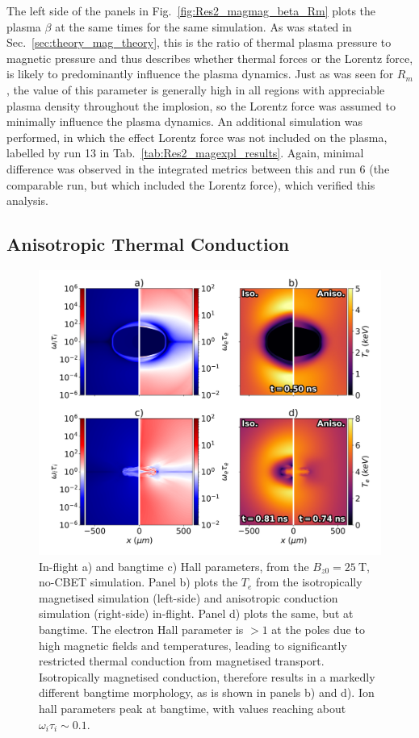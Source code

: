 The left side of the panels in Fig.~\ref{fig:Res2_magmag_beta_Rm} plots the plasma $\beta$ at the same times for the same simulation.
As was stated in Sec.~\ref{sec:theory_mag_theory}, this is the ratio of thermal plasma pressure to magnetic pressure and thus describes whether thermal forces or the Lorentz force, is likely to predominantly influence the plasma dynamics.
Just as was seen for $R_m$, the value of this parameter is generally high in all regions with appreciable plasma density throughout the implosion, so the Lorentz force was assumed to minimally influence the plasma dynamics.
An additional simulation was performed, in which the effect Lorentz force was not included on the plasma, labelled by run 13 in Tab.~\ref{tab:Res2_magexpl_results}.
Again, minimal difference was observed in the integrated metrics between this and run 6 (the comparable run, but which included the Lorentz force), which verified this analysis.

\subsection{Anisotropic Thermal Conduction}%
\label{sec:Res2_aniso}

\begin{figure}[t!]
    \includegraphics[width=0.8\linewidth]{Results2/Images/iso_aniso.png}
    \centering
    \caption{In-flight a) and bangtime c) Hall parameters, from the $B_{z0}=25\ \text{T}$, no-\ac{CBET} simulation.
    Panel b) plots the $T_e$ from the isotropically magnetised simulation (left-side) and anisotropic conduction simulation (right-side) in-flight.
    Panel d) plots the same, but at bangtime.
    The electron Hall parameter is $>1$ at the poles due to high magnetic fields and temperatures, leading to significantly restricted thermal conduction from magnetised transport.
    Isotropically magnetised conduction, therefore results in a markedly different bangtime morphology, as is shown in panels b) and d).
    Ion hall parameters peak at bangtime, with values reaching about $\omega_i\tau_i\sim0.1$.}%
    \label{fig:Res2_iso_aniso}
\end{figure}

